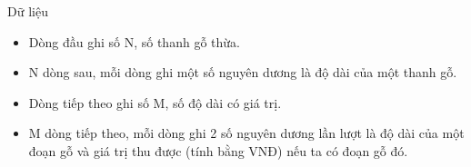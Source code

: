 Dữ liệu
\begin{itemize}
	\item     Dòng đầu ghi số N, số thanh gỗ thừa.   
	\item     N dòng sau, mỗi dòng ghi một số nguyên dương là độ dài của một thanh gỗ.   
	\item     Dòng tiếp theo ghi số M, số độ dài có giá trị.   
	\item     M dòng tiếp theo, mỗi dòng ghi 2 số nguyên dương lần lượt là độ dài của một đoạn gỗ và giá trị thu được (tính bằng VNĐ) nếu ta có đoạn gỗ đó.   
\end{itemize}